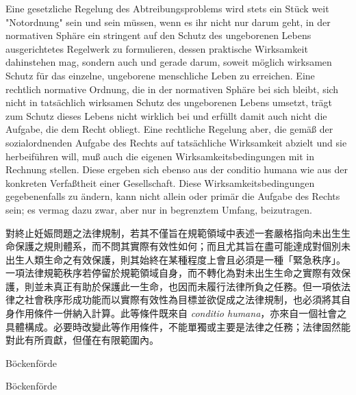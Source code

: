 \documentclass[12pt]{article}
\begin{document}
\begin{sourcepara}[title={原文SondervotumB.332}]
Eine gesetzliche Regelung des Abtreibungsproblems wird stets ein Stück weit "Notordnung" sein und sein müssen, wenn es ihr nicht nur darum geht, in der normativen Sphäre ein stringent auf den Schutz des ungeborenen Lebens ausgerichtetes Regelwerk zu formulieren, dessen praktische Wirksamkeit dahinstehen mag, sondern auch und gerade darum, soweit möglich wirksamen Schutz für das einzelne, ungeborene menschliche Leben zu erreichen. Eine rechtlich normative Ordnung, die in der normativen Sphäre bei sich bleibt, sich nicht in tatsächlich wirksamen Schutz des ungeborenen Lebens umsetzt, trägt zum Schutz dieses Lebens nicht wirklich bei und erfüllt damit auch nicht die Aufgabe, die dem Recht obliegt. Eine rechtliche Regelung aber, die gemäß der sozialordnenden Aufgabe des Rechts auf tatsächliche Wirksamkeit abzielt und sie herbeiführen will, muß auch die eigenen Wirksamkeitsbedingungen mit in Rechnung stellen. Diese ergeben sich ebenso aus der conditio humana wie aus der konkreten Verfaßtheit einer Gesellschaft. Diese Wirksamkeitsbedingungen gegebenenfalls zu ändern, kann nicht allein oder primär die Aufgabe des Rechts sein; es vermag dazu zwar, aber nur in begrenztem Umfang, beizutragen.
\end{sourcepara}
\begin{transpara}
對終止妊娠問題之法律規制，若其不僅旨在規範領域中表述一套嚴格指向未出生生命保護之規則體系，而不問其實際有效性如何；而且尤其旨在盡可能達成對個別未出生人類生命之有效保護，則其始終在某種程度上會且必須是一種「緊急秩序」。一項法律規範秩序若停留於規範領域自身，而不轉化為對未出生生命之實際有效保護，則並未真正有助於保護此一生命，也因而未履行法律所負之任務。但一項依法律之社會秩序形成功能而以實際有效性為目標並欲促成之法律規制，也必須將其自身作用條件一併納入計算。此等條件既來自 \textit{conditio humana}，亦來自一個社會之具體構成。必要時改變此等作用條件，不能單獨或主要是法律之任務；法律固然能對此有所貢獻，但僅在有限範圍內。
\end{transpara}

\stoprandnumbers

\begin{sourcepara}[title={原文SondervotumB.333}]
Böckenförde
\end{sourcepara}
\begin{transpara}
Böckenförde
\end{transpara}

\bilingualstop
\end{document}
